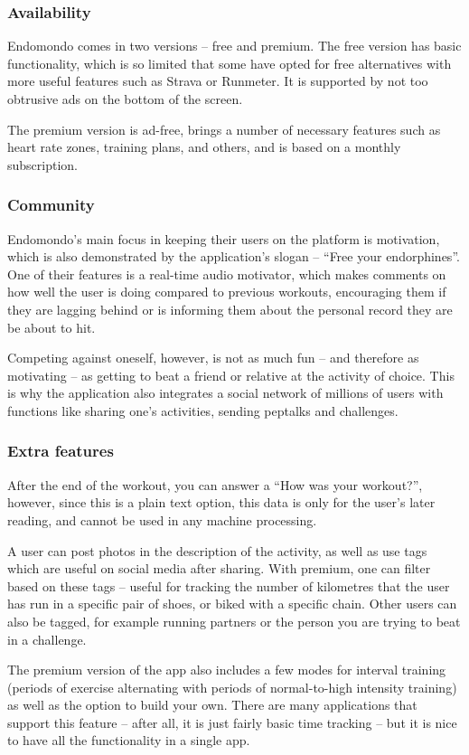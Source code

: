 \subsubsection*{Availability}
Endomondo comes in two versions -- free and premium.
The free version has basic functionality, which is so limited that some have opted for free alternatives with more useful features such as Strava or Runmeter.\cite{endomondo-review}
It is supported by not too obtrusive ads on the bottom of the screen.

The premium version is ad-free, brings a number of necessary features such as heart rate zones, training plans, and others, and is based on a monthly subscription.
\subsubsection*{Community}
Endomondo's main focus in keeping their users on the platform is motivation, which is also demonstrated by the application's slogan -- ``Free your endorphines''.
One of their features is a real-time audio motivator, which makes comments on how well the user is doing compared to previous workouts,
encouraging them if they are lagging behind or is informing them about the personal record they are be about to hit.

Competing against oneself, however, is not as much fun -- and therefore as motivating -- as getting to beat a friend or relative at the activity of choice.
This is why the application also integrates a social network of millions of users with functions like sharing one's activities, sending peptalks and challenges.
\subsubsection*{Extra features}
After the end of the workout, you can answer a ``How was your workout?'', however, since this is a plain text option, this data is only for the user's later reading, and cannot be used in any machine processing.

A user can post photos in the description of the activity, as well as use tags which are useful on social media after sharing.
With premium, one can filter based on these tags -- useful for tracking the number of kilometres that the user has run in a specific pair of shoes, or biked with a specific chain.
Other users can also be tagged, for example running partners or the person you are trying to beat in a challenge.

The premium version of the app also includes a few modes for interval training (periods of exercise alternating with periods of normal-to-high intensity training) as well as the option to build your own.
There are many applications that support this feature -- after all, it is just fairly basic time tracking -- but it is nice to have all the functionality in a single app.
